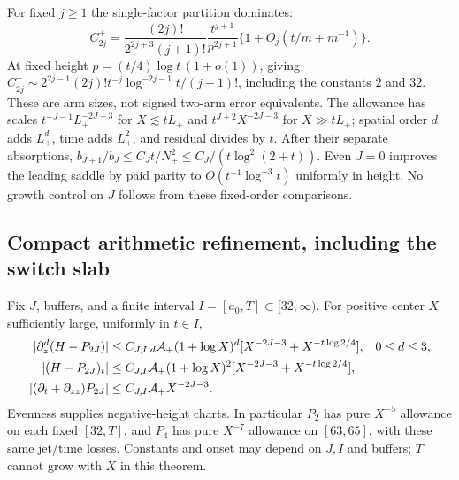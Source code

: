 For fixed $j\ge1$ the single-factor partition dominates:
\[
 C_{2j}^+=\frac{(2j)!}{2^{2j+3}(j+1)!}
          \frac{t^{j+1}}{p^{2j+1}}
       \{1+O_j(t/m+m^{-1})\}.
\]
At fixed height $p=(t/4)\log t\,(1+o(1))$, giving
$C_{2j}^+\sim2^{2j-1}(2j)!t^{-j}\log^{-2j-1}t/(j+1)!$,
including the constants $2$ and $32$. These are arm sizes, not
signed two-arm error equivalents. The allowance has scales
$t^{-J-1}L_+^{-2J-3}$ for $X\lesssim tL_+$ and
$t^{J+2}X^{-2J-3}$ for $X\gg tL_+$; spatial order $d$ adds
$L_+^d$, time adds $L_+^2$, and residual divides by $t$.
After their separate absorptions,
$b_{J+1}/b_J\le C_Jt/N_+^2\le C_J/(t\log^2(2+t))$.
Even $J=0$ improves the leading saddle by paid parity to
$O(t^{-1}\log^{-3}t)$ uniformly in height. No growth control on
$J$ follows from these fixed-order comparisons.

\subsection{Compact arithmetic refinement, including the switch slab}
\begin{theorem}
\label{thm:compact-positive}
Fix $J$, buffers, and a finite interval $I=[a_0,T]\subset[32,\infty)$.
For positive center $X$ sufficiently large, uniformly in $t\in I$,
\begin{align}
 |\partial_z^d(H-P_{2J})|&\le C_{J,I,d}\mathcal A_+(1+\log X)^d
       [X^{-2J-3}+X^{-t\log2/4}],&&0\le d\le3,\notag\\
 |(H-P_{2J})_t|&\le C_{J,I}\mathcal A_+(1+\log X)^2
       [X^{-2J-3}+X^{-t\log2/4}],\notag\\
 |(\partial_t+\partial_{zz})P_{2J}|&\le C_{J,I}\mathcal A_+X^{-2J-3}.
 \label{eq:compact-positive-error}
\end{align}
Evenness supplies negative-height charts. In particular $P_2$ has
pure $X^{-5}$ allowance on each fixed $[32,T]$, and $P_4$ has pure
$X^{-7}$ allowance on $[63,65]$, with these same jet/time losses.
Constants and onset may depend on $J,I$ and buffers; $T$ cannot grow
with $X$ in this theorem.
\end{theorem}
